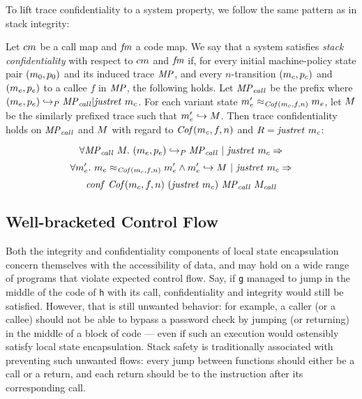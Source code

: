 \documentclass[acmsmall,review,anonymous]{acmart}\settopmatter{printfolios=true,printccs=false,printacmref=false}
\begin{document}
To lift trace confidentiality to a system property, we follow the same
pattern as in stack integrity:

Let $cm$ be a call map and $\mathit{fm}$ a code map. We say that a
system satisfies {\em stack confidentiality} with respect to
$cm$ and $\mathit{fm}$ if, for every initial machine-policy state
pair $(m_0, p_0)$ and its induced trace $\mathit{MP}$, and every
$n$-transition $(m_c, p_c)$ and $(m_e, p_e)$ to a callee
$f$ in $\mathit{MP}$, the following holds. Let $\mathit{MP}_{\mathit{call}}$ be the prefix where
\((m_e,p_e) \hookrightarrow_P \mathit{MP}_{\mathit{call}} | \mathit{justret}\ m_c\).
For each variant state \(m_e' \approx_{\mathit{Cof}(m_c, f, n)}
m_e\), let \(M\) be the similarly prefixed trace such that
\(m_e' \hookrightarrow M\). Then trace confidentiality holds on
\(\mathit{MP}_{\mathit{call}}\) and \(M\) with regard to \(\mathit{Cof}(m_c, f, n)\)
and \(R = \mathit{justret}\ m_c\):

$$\forall \mathit{MP}_{\mathit{call}} ~ M. ~
(m_e,p_e) \hookrightarrow_P \mathit{MP}_{\mathit{call}} ~ | ~ \mathit{justret}\ m_c \Rightarrow$$
$$\forall m_e'. ~ m_e \approx_{\mathit{Cof}(m_c, f, n)} m_e' \wedge
m_e' \hookrightarrow M ~ | ~ \mathit{justret}\ m_c \Rightarrow$$
$$\mathit{conf}~\mathit{Cof}(m_c, f, n) ~ (\mathit{justret}\ m_c) ~ \mathit{MP}_{\mathit{call}} ~ M_{\mathit{call}}$$

\subsection{Well-bracketed Control Flow}
\label{sec:wbcf}

Both the integrity and confidentiality components of local state
encapsulation concern themselves with the accessibility of data, and
may hold on a wide range of programs that violate expected control
flow. Say, if {\tt g} managed to jump in the middle of the
code of {\tt h} with its call, confidentiality and integrity would
still be satisfied.
%
However, that is still unwanted behavior: for example, a caller (or a
callee) should not be able to bypass a password check by jumping (or
returning) in the middle of a block of code --- even if such an execution
would ostensibly satisfy local state encapsulation.
%
Stack safety is traditionally associated with preventing such unwanted
flows: every jump between functions should either be a call or a
return, and each return should be to the instruction after its
corresponding call.
\end{document}
